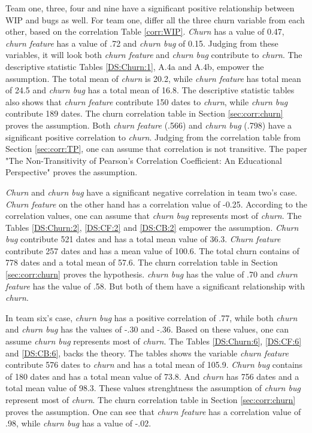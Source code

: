 \documentclass[UKenglish]{ifimaster}  %
\begin{document}
Team one, three, four and nine have a significant positive relationship between WIP and bugs as well. For team one, differ all the three churn variable from each other, based on the correlation Table \ref{corr:WIP}. \textit{Churn} has a value of 0.47, \textit{churn feature} has a value of .72 and \textit{churn bug} of 0.15.  Judging from these variables, it will look both \textit{churn feature} and \textit{churn bug}  contribute to \textit{churn}. The descriptive statistic Tables \ref{DS:Churn:1}, A.4a and A.4b, empower the assumption. The total mean of \textit{churn} is 20.2, while \textit{churn feature} has total mean of 24.5 and \textit{churn bug} has a total mean of 16.8. The descriptive statistic tables also shows that \textit{churn feature} contribute 150 dates to \textit{churn}, while \textit{churn bug} contribute 189 dates. The churn correlation table in Section \ref{sec:corr:churn} proves the assumption. Both \textit{churn feature} (.566) and \textit{churn bug} (.798) have a significant positive correlation to \textit{churn}. Judging from the correlation table from Section \ref{sec:corr:TP},  one can assume that correlation is not transitive. The paper "The Non-Transitivity of Pearson's Correlation Coefficient: An Educational Perspective" \parencite{corr:transitive} proves the assumption. 


\textit{Churn} and \textit{churn bug} have a significant negative correlation in team two's case. \textit{Churn feature} on the other hand has a correlation value of -0.25. According to the correlation values, one can assume that \textit{churn bug} represents most of \textit{churn}. The Tables \ref{DS:Churn:2}, \ref{DS:CF:2} and \ref{DS:CB:2} empower the assumption. \textit{Churn bug} contribute 521 dates and has a total mean value of 36.3. \textit{Churn feature} contribute 257 dates and has a mean value of 100.6. The total churn contains of 778 dates and a total mean of 57.6. The churn correlation table in Section \ref{sec:corr:churn} proves the hypothesis. \textit{churn bug} has the value of .70 and \textit{churn feature} has the value of .58.  But both of them have a significant relationship with \textit{churn}.


In team six's case, \textit{churn bug} has a positive correlation of .77, while both \textit{churn} and \textit{churn bug} has the values of -.30 and -.36. Based on these values, one can assume \textit{churn bug} represents most of \textit{churn}. The Tables \ref{DS:Churn:6}, \ref{DS:CF:6} and \ref{DS:CB:6}, backs the theory. The tables shows the variable \textit{churn feature} contribute 576 dates to \textit{churn} and has a total mean of 105.9. \textit{Churn bug} contains of 180 dates and has a total mean value of 73.8. And \textit{churn} has 756 dates and a total mean value of 98.3. These values strenghtness the assumption of \textit{churn bug} represent most of \textit{churn}.  The churn correlation table in Section \ref{sec:corr:churn} proves the assumption. One can see that \textit{churn feature} has a correlation value of .98, while \textit{churn bug} has a value of -.02.
\end{document}
